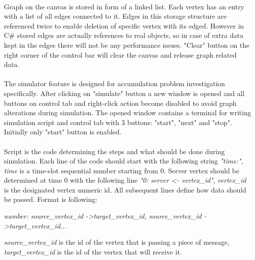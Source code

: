 \documentclass[a4paper,TexShade]{class}
\begin{document}
\paragraph{} Graph on the canvas is stored in form of a linked list. Each vertex has an entry with a list of all edges connected to it. Edges in this storage structure are referenced twice to enable deletion of specific vertex with its edged. However in C\# stored edges are actually references to real objects, so in case of extra data kept in the edges there will not be any performance issues. "Clear" button on the right corner of the control bar will clear the canvas and release graph related data.


\paragraph{} The simulator feature is designed for accumulation problem investigation specifically. After clicking on "simulate" button a new window is opened and all buttons on control tab and right-click action become disabled to avoid graph alterations during simulation. The opened window contains a terminal for writing simulation script and control tab with 3 buttons: "start", "next" and "stop". Initially only "start" button is enabled. 

\paragraph{} Script is the code determining the steps and what should be done during simulation. Each line of the code should start with the following string\textit{ "time:"}, \textit{time} is a time-slot sequential number starting from 0. Server vertex should be determined at time 0 with the following line \textit{"0: server \textless- vertex\_id"}, \textit{vertex\_id} is the designated vertex numeric id.
All subsequent lines define how data should be passed. Format is following: 
\bigskip

\textit{number: source\_vertex\_id -\textgreater target\_vertex\_id, source\_vertex\_id -\textgreater target\_vertex\_id...}
\linebreak

\textit{source\_vertex\_id} is the id of the vertex that is passing a piece of message, \textit{target\_vertex\_id} is the id of the vertex that will receive it.
\end{document}
